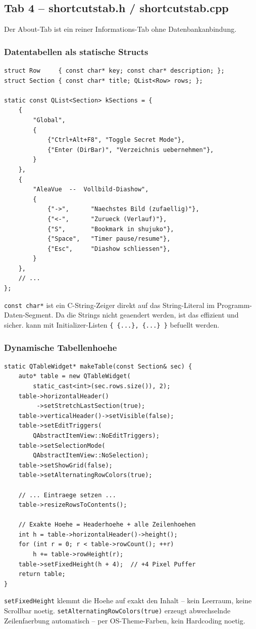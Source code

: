 \subsection{Tab 4 -- shortcutstab.h / shortcutstab.cpp}

Der About-Tab ist ein reiner Informations-Tab ohne
Datenbankanbindung.

\subsubsection{Datentabellen als statische Structs}

\begin{lstlisting}[caption={Datenmodell als Compile-Zeit-Konstanten}]
struct Row     { const char* key; const char* description; };
struct Section { const char* title; QList<Row> rows; };

static const QList<Section> kSections = {
    {
        "Global",
        {
            {"Ctrl+Alt+F8", "Toggle Secret Mode"},
            {"Enter (DirBar)", "Verzeichnis uebernehmen"},
        }
    },
    {
        "AleaVue  --  Vollbild-Diashow",
        {
            {"->",      "Naechstes Bild (zufaellig)"},
            {"<-",      "Zurueck (Verlauf)"},
            {"S",       "Bookmark in shujuko"},
            {"Space",   "Timer pause/resume"},
            {"Esc",     "Diashow schliessen"},
        }
    },
    // ...
};
\end{lstlisting}

\verb|const char*| ist ein C-String-Zeiger direkt auf
das String-Literal im Programm-Daten-Segment. Da die
Strings nicht geaendert werden, ist das effizient und
sicher.  kann mit
Initializer-Listen \verb|{ {...}, {...} }| befuellt werden.

\subsubsection{Dynamische Tabellenhoehe}

\begin{lstlisting}[caption={makeTable: exakte Hoehe berechnen}]
static QTableWidget* makeTable(const Section& sec) {
    auto* table = new QTableWidget(
        static_cast<int>(sec.rows.size()), 2);
    table->horizontalHeader()
         ->setStretchLastSection(true);
    table->verticalHeader()->setVisible(false);
    table->setEditTriggers(
        QAbstractItemView::NoEditTriggers);
    table->setSelectionMode(
        QAbstractItemView::NoSelection);
    table->setShowGrid(false);
    table->setAlternatingRowColors(true);

    // ... Eintraege setzen ...
    table->resizeRowsToContents();

    // Exakte Hoehe = Headerhoehe + alle Zeilenhoehen
    int h = table->horizontalHeader()->height();
    for (int r = 0; r < table->rowCount(); ++r)
        h += table->rowHeight(r);
    table->setFixedHeight(h + 4);  // +4 Pixel Puffer
    return table;
}
\end{lstlisting}

\verb|setFixedHeight| klemmt die Hoehe auf exakt den
Inhalt -- kein Leerraum, keine Scrollbar noetig.
\verb|setAlternatingRowColors(true)| erzeugt abwechselnde
Zeilenfaerbung automatisch -- per OS-Theme-Farben,
kein Hardcoding noetig.
